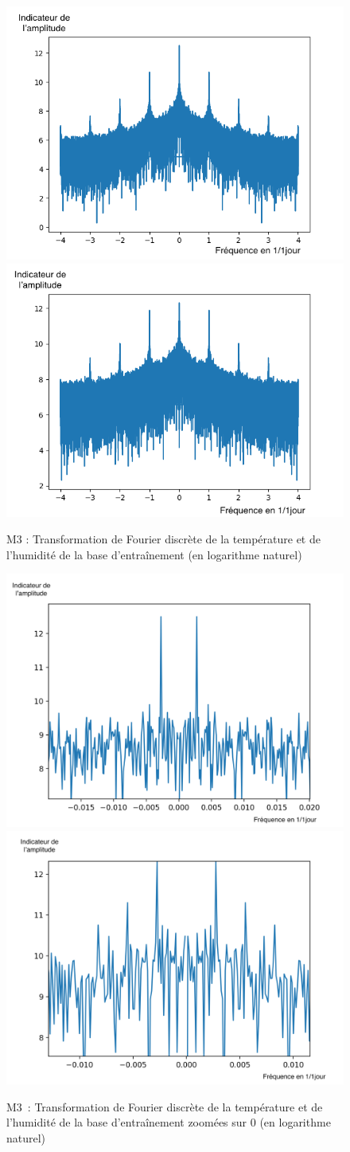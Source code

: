 \documentclass[11pt,a4paper]{article}
\begin{document}
\begin{figure} [!h]
\centering
\includegraphics[width=0.48 \textwidth]{imagesTIPE/fftT.png}\quad
\includegraphics[width=0.48 \textwidth]{imagesTIPE/fftH.png}
\caption{\label{fig:ffta} M3 : Transformation de Fourier discrète de la température et de l'humidité de la base d'entraînement (en logarithme naturel)}
\end{figure}
\begin{figure} [!h]
\centering
\includegraphics[width=0.48 \textwidth]{imagesTIPE/fftTZ.png}\quad
\includegraphics[width=0.48 \textwidth]{imagesTIPE/fftHZ.png}
\caption{\label{fig:fftz} M3~: Transformation de Fourier discrète de la température et de l'humidité de la base d'entraînement zoomées sur 0 (en logarithme naturel) }
\end{figure}
\end{document}
